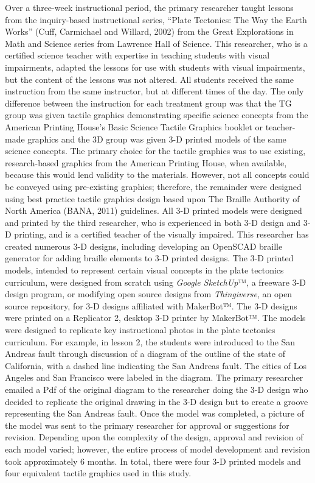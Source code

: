 \documentclass[11.5pt]{sig-alternate} %
\begin{document}
\begin{large}
Over a three-week instructional period, the primary researcher taught lessons from the inquiry-based instructional series, “Plate Tectonics: The Way the Earth Works” (Cuff, Carmichael and Willard, 2002) from the Great Explorations in Math and Science series from Lawrence Hall of Science.  This researcher, who is a certified science teacher with expertise in teaching students with visual impairments, adapted the lessons for use with students with visual impairments, but the content of the lessons was not altered.  All students received the same instruction from the same instructor, but at different times of the day.  The only difference between the instruction for each treatment group was that the TG group was given tactile graphics demonstrating specific science concepts from the American Printing House’s Basic Science Tactile Graphics booklet or teacher-made graphics and the 3D group was given 3-D printed models of the same science concepts.  The primary choice for the tactile graphics was to use existing, research-based graphics from the American Printing House, when available, because this would lend validity to the materials.  However, not all concepts could be conveyed using pre-existing graphics; therefore, the remainder were designed using best practice tactile graphics design based upon The Braille Authority of North America (BANA, 2011) guidelines.  All 3-D printed models were designed and printed by the third researcher, who is experienced in both 3-D design and 3-D printing, and is a certified teacher of the visually impaired.  This researcher has created numerous 3-D designs, including developing an OpenSCAD braille generator for adding braille elements to 3-D printed designs.  The 3-D printed models, intended to represent certain visual concepts in the plate tectonics curriculum, were designed from scratch using \textit{Google SketchUp}™, a freeware 3-D design program, or modifying open source designs from \textit{Thingiverse}, an open source repository, for 3-D designs affiliated with MakerBot™.  The 3-D designs were printed on a Replicator 2, desktop 3-D printer by MakerBot™.  The models were designed to replicate key instructional photos in the plate tectonics curriculum.  For example, in lesson 2, the students were introduced to the San Andreas fault through discussion of a diagram of the outline of the state of California, with a dashed line indicating the San Andreas fault.  The cities of Los Angeles and San Francisco were labeled in the diagram.   The primary researcher emailed a Pdf of the original diagram to the researcher doing the 3-D design who decided to replicate the original drawing in the 3-D design but to create a groove representing the San Andreas fault.  Once the model was completed, a picture of the model was sent to the primary researcher for approval or suggestions for revision.  Depending upon the complexity of the design, approval and revision of each model varied; however, the entire process of model development and revision took approximately 6 months.  In total, there were four 3-D printed models and four equivalent tactile graphics used in this study.  


\end{large}
\end{document}
